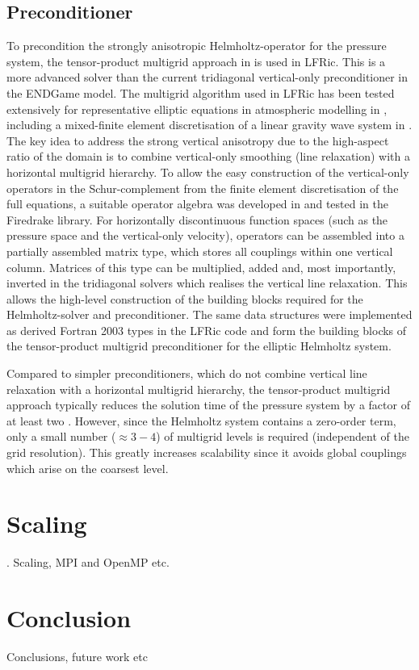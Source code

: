 \documentclass[times]{elsarticle}
\begin{document}
\subsection{\label{sec:preconditioner}Preconditioner}
To precondition the strongly anisotropic Helmholtz-operator for the
pressure system, the tensor-product multigrid approach in
\cite{Borm2001} is used in LFRic. This is a more advanced solver than
the current tridiagonal vertical-only preconditioner in the ENDGame
model. The multigrid algorithm used in LFRic has been tested
extensively for representative elliptic equations in atmospheric
modelling in \cite{Mueller2014,Dedner2016}, including a mixed-finite
element discretisation of a linear gravity wave system in
\cite{Mitchell2016}. The key idea to address the strong vertical
anisotropy due to the high-aspect ratio of the domain is to combine
vertical-only smoothing (line relaxation) with a horizontal multigrid
hierarchy. To allow the easy construction of the vertical-only
operators in the Schur-complement from the finite element
discretisation of the full equations, a suitable operator algebra was
developed in \cite{Mitchell2016} and tested in the Firedrake
library. For horizontally discontinuous function spaces (such as the
pressure space and the vertical-only velocity), operators can be
assembled into a partially assembled matrix type, which stores all
couplings within one vertical column. Matrices of this type can be
multiplied, added and, most importantly, inverted in the tridiagonal
solvers which realises the vertical line relaxation. This allows the
high-level construction of the building blocks required for the
Helmholtz-solver and preconditioner. The same data structures were
implemented as derived Fortran 2003 types in the LFRic code and form
the building blocks of the tensor-product multigrid preconditioner for
the elliptic Helmholtz system.

Compared to simpler preconditioners, which do not combine vertical
line relaxation with a horizontal multigrid hierarchy, the
tensor-product multigrid approach typically reduces the solution time
of the pressure system by a factor of at least two
\cite{Mueller2014,Mitchell2016}. However, since the Helmholtz system
contains a zero-order term, only a small number ($\approx 3-4$) of
multigrid levels is required (independent of the grid
resolution). This greatly increases scalability since it avoids global
couplings which arise on the coarsest level.

\section{\label{sec:scal}Scaling}.
Scaling, MPI and OpenMP etc.

\section{Conclusion}
\label{sec:con}
Conclusions, future work etc



\end{document}
